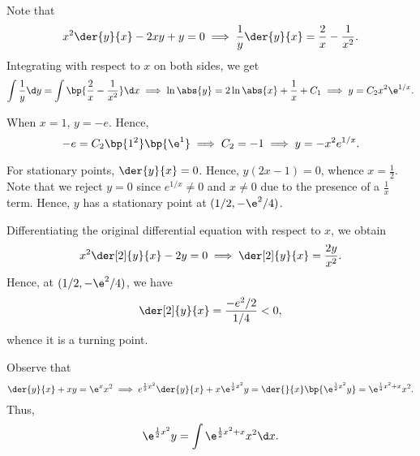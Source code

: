 \begin{solution}
    \begin{ppart}
        \begin{psubpart}
            Note that \[x^2 \der{y}{x} - 2xy + y = 0 \implies \frac1y \der{y}{x} = \frac2{x} - \frac1{x^2}.\] Integrating with respect to $x$ on both sides, we get \[\int \frac1y \d y = \int \bp{\frac2{x} - \frac1{x^2}} \d x \implies \ln \abs{y} = 2 \ln \abs{x} + \frac1x + C_1 \implies y = C_2 x^2 \e^{1/x}.\]
        \end{psubpart}
        \begin{psubpart}
            When $x = 1$, $y = -e$. Hence, \[-e = C_2\bp{1^2}\bp{\e^{1}} \implies C_2 = -1 \implies y = -x^2 e^{1/x}.\]

            For stationary points, $\der{y}{x} = 0$. Hence, $y(2x - 1) = 0$, whence $x = \frac12$. Note that we reject $y = 0$ since $e^{1/x} \neq 0$ and $x \neq 0$ due to the presence of a $\frac1x$ term. Hence, $y$ has a stationary point at $(1/2, -\e^2/4)$.

            Differentiating the original differential equation with respect to $x$, we obtain \[x^2 \der[2]{y}{x} - 2y = 0 \implies \der[2]{y}{x} = \frac{2y}{x^2}.\] Hence, at $(1/2, -\e^2/4)$, we have \[\der[2]{y}{x} = \frac{-e^2/2}{1/4} < 0,\] whence it is a turning point.

            \begin{center}
            \end{center}
        \end{psubpart}
    \end{ppart}
    \begin{ppart}
        Observe that \[\der{y}{x} + xy = \e^x x^2 \implies e^{\frac12 x^2}\der{y}{x} + x\e^{\frac12 x^2}y = \der{}{x} \bp{\e^{\frac12 x^2} y} = \e^{\frac12 x^2 + x} x^2.\] Thus, \[\e^{\frac12 x^2} y = \int \e^{\frac12 x^2 + x} x^2 \d x.\]


\end{ppart}
\end{solution}

